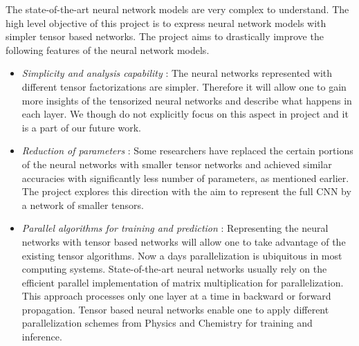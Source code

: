 
The state-of-the-art neural network models are very complex to understand. The high level objective of this project is to express neural network models with simpler tensor based networks. 
The \prname project aims to drastically improve the following features of the neural network models.
\begin{itemize}
	\item \emph{Simplicity and analysis capability} : The neural networks represented with different tensor factorizations are simpler. Therefore it will allow one to gain more insights of the tensorized neural networks and describe what happens in each layer. We though do not explicitly focus on this aspect in \prname project and it is a part of our future work.
	\item \emph{Reduction of parameters} : Some researchers have replaced the certain portions of the neural networks with smaller tensor networks and achieved  similar accuracies with significantly less number of parameters, as mentioned earlier. The \prname project explores this direction with the aim to represent the full CNN by a network of smaller tensors. 
	\item \emph{Parallel algorithms for training and prediction} : Representing the neural networks with tensor based networks will allow one to take advantage of the existing tensor algorithms. Now a days parallelization is ubiquitous in most computing systems. State-of-the-art neural networks usually rely on the efficient parallel implementation of matrix multiplication for parallelization. This approach processes only one layer at a time in backward or forward propagation. Tensor based neural networks enable one to apply different parallelization schemes from Physics and Chemistry for training and inference.
\end{itemize}


